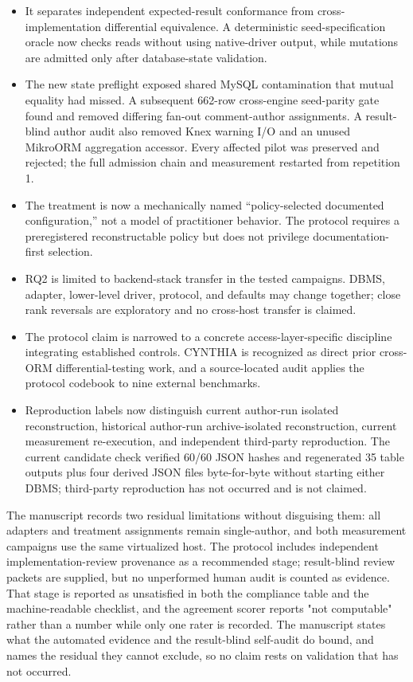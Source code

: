 \documentclass[11pt,a4paper]{article}
\begin{document}
\begin{itemize}
  \item It separates independent expected-result conformance from cross-implementation differential equivalence. A deterministic seed-specification oracle now checks reads without using native-driver output, while mutations are admitted only after database-state validation.
  \item The new state preflight exposed shared MySQL contamination that mutual equality had missed. A subsequent 662-row cross-engine seed-parity gate found and removed differing fan-out comment-author assignments. A result-blind author audit also removed Knex warning I/O and an unused MikroORM aggregation accessor. Every affected pilot was preserved and rejected; the full admission chain and measurement restarted from repetition 1.
  \item The treatment is now a mechanically named ``policy-selected documented configuration,'' not a model of practitioner behavior. The protocol requires a preregistered reconstructable policy but does not privilege documentation-first selection.
  \item RQ2 is limited to backend-stack transfer in the tested campaigns. DBMS, adapter, lower-level driver, protocol, and defaults may change together; close rank reversals are exploratory and no cross-host transfer is claimed.
  \item The protocol claim is narrowed to a concrete access-layer-specific discipline integrating established controls. CYNTHIA is recognized as direct prior cross-ORM differential-testing work, and a source-located audit applies the protocol codebook to nine external benchmarks.
  \item Reproduction labels now distinguish current author-run isolated reconstruction, historical author-run archive-isolated reconstruction, current measurement re-execution, and independent third-party reproduction. The current candidate check verified 60/60 JSON hashes and regenerated 35 table outputs plus four derived JSON files byte-for-byte without starting either DBMS; third-party reproduction has not occurred and is not claimed.
\end{itemize}

The manuscript records two residual limitations without disguising them: all adapters and treatment assignments remain single-author, and both measurement campaigns use the same virtualized host. The protocol includes independent implementation-review provenance as a recommended stage; result-blind review packets are supplied, but no unperformed human audit is counted as evidence. That stage is reported as unsatisfied in both the compliance table and the machine-readable checklist, and the agreement scorer reports "not computable" rather than a number while only one rater is recorded. The manuscript states what the automated evidence and the result-blind self-audit do bound, and names the residual they cannot exclude, so no claim rests on validation that has not occurred.
\end{document}
